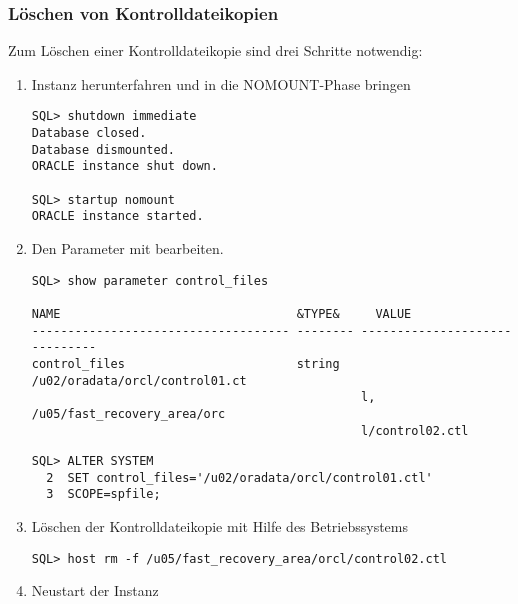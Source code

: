         \subsubsection{L\"oschen von Kontrolldateikopien}
        Zum L\"oschen einer Kontrolldateikopie sind drei Schritte notwendig:
        \begin{enumerate}
          \item Instanz herunterfahren und in die NOMOUNT-Phase bringen
            \begin{lstlisting}[caption={L\"oschen von Kontrolldateikopien 1},label=admin28,language=sqlplus]
SQL> shutdown immediate
Database closed.
Database dismounted.
ORACLE instance shut down.

SQL> startup nomount
ORACLE instance started.
            \end{lstlisting}
          \item Den Parameter  mit  bearbeiten.
            \begin{lstlisting}[caption={L\"oschen von Kontrolldateikopien 2a},label=admin29,language=sqlplus]
SQL> show parameter control_files

NAME                                 &TYPE&     VALUE
------------------------------------ -------- ------------------------------
control_files                        string   /u02/oradata/orcl/control01.ct
                                              l, /u05/fast_recovery_area/orc
                                              l/control02.ctl
						\end{lstlisting}
\clearpage
						\begin{lstlisting}[caption={L\"oschen von Kontrolldateikopien
						2b},language=oracle_sql]
SQL> ALTER SYSTEM
  2  SET control_files='/u02/oradata/orcl/control01.ctl'
  3  SCOPE=spfile;
            \end{lstlisting}
          \item L\"oschen der Kontrolldateikopie mit Hilfe des Betriebssystems
            \begin{lstlisting}[caption={L\"oschen von Kontrolldateikopien 3},label=admin29a,language=sqlplus]
SQL> host rm -f /u05/fast_recovery_area/orcl/control02.ctl
            \end{lstlisting}
          \item Neustart der Instanz
        \end{enumerate}

        \begin{literaturinternet}
          \item \cite{i1006088}
        \end{literaturinternet}

